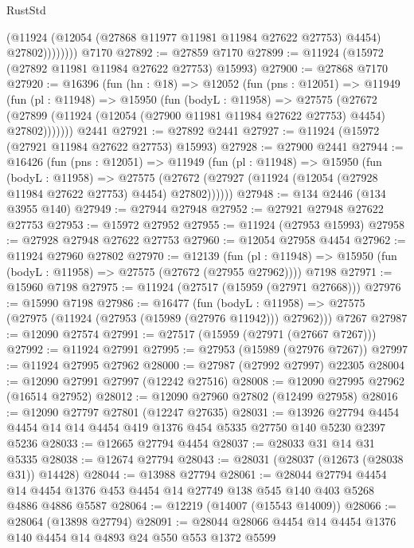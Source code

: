 \begin{lexlean}{RustStd}
\begin{coremodule}
                  (@11924 (@12054 (@27868 @11977 @11981 @11984 @27622 @27753) @4454) @27802))))))))
    @7170
@27892 := @27859 @7170
@27899 := @11924 (@15972 (@27892 @11981 @11984 @27622 @27753) @15993)
@27900 := @27868 @7170
@27920 := @16396
    (fun (hn : @18) =>
    @12052
      (fun (pns : @12051) =>
      @11949
        (fun (pl : @11948) =>
        @15950
          (fun (bodyL : @11958) =>
          @27575
            (@27672
              (@27899 (@11924 (@12054 (@27900 @11981 @11984 @27622 @27753) @4454) @27802)))))))
    @2441
@27921 := @27892 @2441
@27927 := @11924 (@15972 (@27921 @11984 @27622 @27753) @15993)
@27928 := @27900 @2441
@27944 := @16426
    (fun (pns : @12051) =>
    @11949
      (fun (pl : @11948) =>
      @15950
        (fun (bodyL : @11958) =>
        @27575 (@27672 (@27927 (@11924 (@12054 (@27928 @11984 @27622 @27753) @4454) @27802))))))
@27948 := @134 @2446 (@134 @3955 @140)
@27949 := @27944 @27948
@27952 := @27921 @27948 @27622 @27753
@27953 := @15972 @27952
@27955 := @11924 (@27953 @15993)
@27958 := @27928 @27948 @27622 @27753
@27960 := @12054 @27958 @4454
@27962 := @11924 @27960 @27802
@27970 := @12139
    (fun (pl : @11948) => @15950 (fun (bodyL : @11958) => @27575 (@27672 (@27955 @27962))))
    @7198
@27971 := @15960 @7198
@27975 := @11924 (@27517 (@15959 (@27971 @27668)))
@27976 := @15990 @7198
@27986 := @16477
    (fun (bodyL : @11958) => @27575 (@27975 (@11924 (@27953 (@15989 (@27976 @11942))) @27962)))
    @7267
@27987 := @12090 @27574
@27991 := @27517 (@15959 (@27971 (@27667 @7267)))
@27992 := @11924 @27991
@27995 := @27953 (@15989 (@27976 @7267))
@27997 := @11924 @27995 @27962
@28000 := @27987 (@27992 @27997) @22305
@28004 := @12090 @27991 @27997 (@12242 @27516)
@28008 := @12090 @27995 @27962 (@16514 @27952)
@28012 := @12090 @27960 @27802 (@12499 @27958)
@28016 := @12090 @27797 @27801 (@12247 @27635)
@28031 := @13926
    @27794
    @4454
    @4454
    @14
    @14
    @4454
    @419
    @1376
    @454
    @5335
    @27750
    @140
    @5230
    @2397
    @5236
@28033 := @12665 @27794 @4454
@28037 := @28033 @31 @14 @31 @5335
@28038 := @12674 @27794
@28043 := @28031 (@28037 (@12673 (@28038 @31)) @14428)
@28044 := @13988 @27794
@28061 := @28044
    @27794
    @4454
    @14
    @4454
    @1376
    @453
    @4454
    @14
    @27749
    @138
    @545
    @140
    @403
    @5268
    @4886
    @4886
    @5587
@28064 := @12219 (@14007 (@15543 @14009))
@28066 := @28064 (@13898 @27794)
@28091 := @28044
    @28066
    @4454
    @14
    @4454
    @1376
    @140
    @4454
    @14
    @4893
    @24
    @550
    @553
    @1372
    @5599

\end{coremodule}
\end{lexlean}
